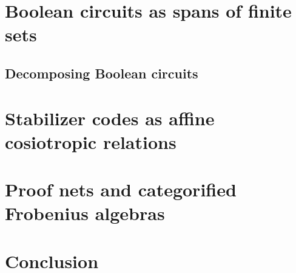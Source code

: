 \documentclass[12pt]{ociamthesis}  %
\begin{document}
\chapter{Boolean circuits as spans of finite sets}
\label{chap:zxa}


\section{Decomposing Boolean circuits}
\label{sec:dist}


\chapter{Stabilizer codes as affine cosiotropic relations}
\label{chap:stab}


\chapter{Proof nets and categorified Frobenius algebras}
\label{chap:grothendieck}


\chapter{Conclusion}
\label{chap:conclusion}




\end{document}
